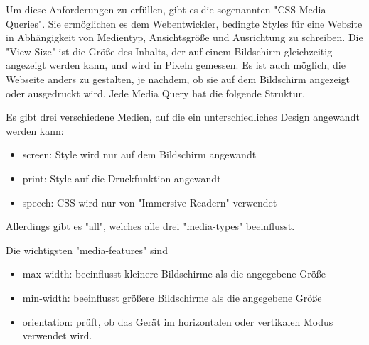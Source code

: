 
Um diese Anforderungen zu erfüllen, gibt es die sogenannten "CSS-Media-Queries". Sie ermöglichen es dem Webentwickler, bedingte Styles für eine Website in Abhängigkeit von Medientyp, Ansichtsgröße und Ausrichtung zu schreiben. Die "View Size" ist die Größe des Inhalts, der auf einem Bildschirm gleichzeitig angezeigt werden kann, und wird in Pixeln gemessen. Es ist auch möglich, die Webseite anders zu gestalten, je nachdem, ob sie auf dem Bildschirm angezeigt oder ausgedruckt wird. Jede Media Query hat die folgende Struktur.


Es gibt drei verschiedene Medien, auf die ein unterschiedliches Design angewandt werden kann: 
\begin{itemize}
    \item screen: Style wird nur auf dem Bildschirm angewandt
    \item print: Style auf die Druckfunktion angewandt 
    \item speech: CSS wird nur von "Immersive Readern" verwendet
\end{itemize}
Allerdings gibt es "all", welches alle drei "media-types" beeinflusst.

Die wichtigsten "media-features" sind

\begin{itemize}
    \item max-width: beeinflusst kleinere Bildschirme als die angegebene Größe
    \item min-width: beeinflusst größere Bildschirme als die angegebene Größe 
    \item orientation: prüft, ob das Gerät im horizontalen oder vertikalen Modus verwendet wird.
\end{itemize}
